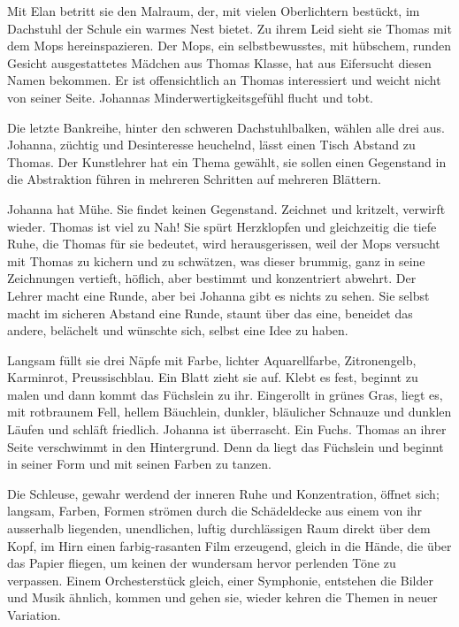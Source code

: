 \documentclass[10pt,a5paper]{book}
\begin{document}
Mit Elan betritt sie den Malraum, der, mit vielen Oberlichtern bestückt, im Dachstuhl der Schule ein warmes Nest bietet. Zu ihrem Leid sieht sie Thomas mit dem Mops hereinspazieren. Der Mops, ein selbstbewusstes, mit hübschem, runden Gesicht ausgestattetes Mädchen aus Thomas Klasse, hat aus Eifersucht diesen Namen bekommen. Er ist offensichtlich an Thomas interessiert und weicht nicht von seiner Seite. Johannas Minderwertigkeitsgefühl flucht und tobt.

Die letzte Bankreihe, hinter den schweren Dachstuhlbalken, wählen alle drei aus. Johanna, züchtig und Desinteresse heuchelnd, lässt einen Tisch Abstand zu Thomas. Der Kunstlehrer hat ein Thema gewählt, sie sollen einen Gegenstand in die Abstraktion führen in mehreren Schritten auf mehreren Blättern.

Johanna hat Mühe. Sie findet keinen Gegenstand. Zeichnet und kritzelt, verwirft wieder. Thomas ist viel zu Nah! Sie spürt Herzklopfen und gleichzeitig die tiefe Ruhe, die Thomas für sie bedeutet, wird herausgerissen, weil der Mops versucht mit Thomas zu kichern und zu schwätzen, was dieser brummig, ganz in seine Zeichnungen vertieft, höflich, aber bestimmt und konzentriert abwehrt. Der Lehrer macht eine Runde, aber bei Johanna gibt es nichts zu sehen. Sie selbst macht im sicheren Abstand eine Runde, staunt über das eine, beneidet das andere, belächelt und wünschte sich, selbst eine Idee zu haben.

Langsam füllt sie drei  Näpfe mit Farbe, lichter Aquarellfarbe, Zitronengelb, Karminrot, Preussischblau. Ein Blatt zieht sie auf. Klebt es fest, beginnt zu malen und dann kommt das Füchslein zu ihr. Eingerollt in grünes Gras, liegt es, mit rotbraunem Fell, hellem Bäuchlein, dunkler, bläulicher Schnauze und dunklen Läufen und schläft friedlich. Johanna ist überrascht. Ein Fuchs. Thomas an ihrer Seite verschwimmt in den Hintergrund. Denn da liegt das Füchslein und beginnt in seiner  Form und mit seinen Farben zu tanzen.

Die Schleuse, gewahr werdend der inneren Ruhe und Konzentration, öffnet sich; langsam, Farben, Formen strömen durch die Schädeldecke aus einem von ihr ausserhalb liegenden, unendlichen, luftig durchlässigen Raum direkt über dem Kopf, im Hirn einen farbig-rasanten Film erzeugend, gleich in die Hände, die über das Papier fliegen, um keinen der wundersam hervor perlenden Töne zu verpassen. Einem Orchesterstück gleich, einer Symphonie, entstehen die Bilder und Musik ähnlich, kommen und gehen sie, wieder kehren die Themen in neuer Variation.
\end{document}
